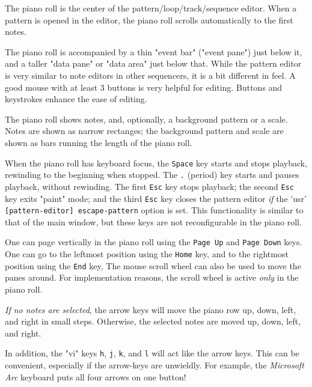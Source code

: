    The piano roll is the center of the pattern/loop/track/sequence editor.
   When a pattern is opened in the editor, the piano roll scrolls
   automatically to the first notes.

   The piano roll is accompanied by a thin "event bar"
   ("event pane") just below it,
   and a taller "data pane" or "data area" just below that.
   While the pattern editor is very similar to note editors in other
   sequencers, it is a bit different in feel.  A good mouse with at least 3
   buttons is very helpful for editing.  Buttons and keystrokes enhance the
   ease of editing.

   The piano roll shows notes, and, optionally, a background pattern or a
   scale.  Notes are shown as narrow rectanges; the background
   pattern and scale are shown as bars running the length of the piano roll.

   When the piano roll has keyboard focus, the \texttt{Space} key
   starts and stops playback, rewinding to the beginning when stopped.
   The \texttt{.} (period) key starts and pauses playback, without
   rewinding.
   The first \texttt{Esc} key stops playback;
   the second \texttt{Esc} key exits "paint" mode; and
   the third \texttt{Esc} key closes the pattern editor \textsl{if}
   the 'usr' \texttt{[pattern-editor] escape-pattern} option is set.
   This functionality is similar to that of the main window, but
   these keys are not reconfigurable in the piano roll.

   One can page vertically in the piano roll using the
    \texttt{Page Up} and 
    \texttt{Page Down} keys.
   One can go to the leftmost position using the 
    \texttt{Home} key,
   and to the rightmost position using the
    \texttt{End} key,
   The mouse scroll wheel can also be used to move the panes around.
   For implementation reasons, the scroll wheel is active
   \textsl{only} in the piano roll.

   \textsl{If no notes are selected}, the arrow keys will move the piano row
   up, down, left, and right in small steps.
   Otherwise, the selected notes are moved
   up, down, left, and right.

   In addition, the "vi" keys \texttt{h}, \texttt{j}, \texttt{k}, and
   \texttt{l} will act like the arrow keys. This can be convenient, especially
   if the arrow-keys are unwieldly.  For example, the
   \textsl{Microsoft Arc} keyboard puts all four arrows on one button!

